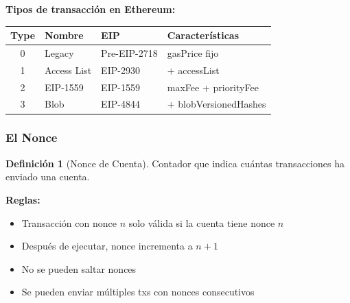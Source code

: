 \documentclass[11pt,a4paper,twoside,openright]{book}
\theoremstyle{definition}
\newtheorem{definition}{Definición}[chapter]
\theoremstyle{plain}
\theoremstyle{remark}
\begin{document}
\begin{mathnote}
\textbf{Tipos de transacción en Ethereum:}

\begin{center}
\begin{tabular}{clll}
\toprule
\textbf{Type} & \textbf{Nombre} & \textbf{EIP} & \textbf{Características} \\
\midrule
0 & Legacy & Pre-EIP-2718 & gasPrice fijo \\
1 & Access List & EIP-2930 & + accessList \\
2 & EIP-1559 & EIP-1559 & maxFee + priorityFee \\
3 & Blob & EIP-4844 & + blobVersionedHashes \\
\bottomrule
\end{tabular}
\end{center}
\end{mathnote}

\subsubsection{El Nonce}

\begin{definition}[Nonce de Cuenta]
Contador que indica cuántas transacciones ha enviado una cuenta.

\textbf{Reglas:}
\begin{itemize}
    \item Transacción con nonce $n$ solo válida si la cuenta tiene nonce $n$
    \item Después de ejecutar, nonce incrementa a $n+1$
    \item No se pueden saltar nonces
    \item Se pueden enviar múltiples txs con nonces consecutivos
\end{itemize}
\end{definition}
\end{document}
